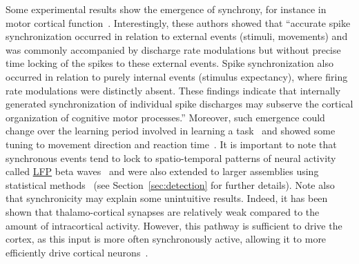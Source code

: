 \documentclass[brainsci, %
               review,submit,pdftex,moreauthors
               ]{Definitions/mdpi}
\begin{document}
Some experimental results show the emergence of synchrony, for instance in motor cortical function~\citep{riehle_spike_1997}. Interestingly, these authors showed that ``accurate spike synchronization occurred in relation to external events (stimuli, movements) and was commonly accompanied by discharge rate modulations but without precise time locking of the spikes to these external events. Spike synchronization also occurred in relation to purely internal events (stimulus expectancy), where firing rate modulations were distinctly absent. These findings indicate that internally generated synchronization of individual spike discharges may subserve the cortical organization of cognitive motor processes.'' Moreover, such emergence could change over the learning period involved in learning a task~\citep{kilavik_long-term_2009} and showed some tuning to movement direction and reaction time~\citep{grammont_spike_2003}. It is important to note that synchronous events tend to lock to spatio-temporal patterns of neural activity called \href{https://en.wikipedia.org/wiki/Local_field_potential}{LFP} beta waves~\citep{denker_lfp_2018} and were also extended to larger assemblies using statistical methods~\citep{torre_asset_2016} (see Section~\ref{sec:detection} for further details). Note also that synchronicity may explain some unintuitive results. Indeed, it has been shown that thalamo-cortical synapses are relatively weak compared to the amount of intracortical activity. However, this pathway is sufficient to drive the cortex, as this input is more often synchronously active, allowing it to more efficiently drive cortical neurons~\citep{bruno_cortex_2006}. 
\end{document}
